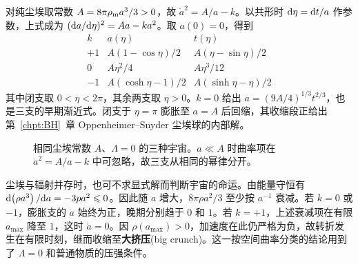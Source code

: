 对纯尘埃取常数 $A=8\pi\rho_{\rm m}a^3/3>0$，故 $\dot a^2=A/a-k$。以共形时 $\dd\eta=\dd t/a$ 作参数，上式成为 $(\dd a/\dd\eta)^2=Aa-ka^2$。取 $a(0)=0$，得到
\begin{equation}\label{eq:cosmo-dust}
    \begin{array}{c|cc}
       k & a(\eta) & t(\eta) \\ \hline
       +1 & A(1-\cos\eta)/2 & A(\eta-\sin\eta)/2 \\
        0 & A\eta^2/4 & A\eta^3/12 \\
       -1 & A(\cosh\eta-1)/2 & A(\sinh\eta-\eta)/2
    \end{array}
\end{equation}
其中闭支取 $0<\eta<2\pi$，其余两支取 $\eta>0$。$k=0$ 给出 $a=(9A/4)^{1/3}t^{2/3}$，也是三支的早期渐近式。闭支于 $\eta=\pi$ 膨胀至 $a=A$ 后回缩，其收缩段正给出第~\ref{chpt:BH}~章 Oppenheimer--Snyder 尘埃球的内部解。

\begin{figure}[htbp]
    \centering
    \caption{相同尘埃常数 $A$、$\Lambda=0$ 的三种宇宙。$a\ll A$ 时曲率项在 $\dot a^2=A/a-k$ 中可忽略，故三支从相同的幂律分开。}
    \label{fig:cosmo-dust}
\end{figure}

尘埃与辐射并存时，也可不求显式解而判断宇宙的命运。由能量守恒有 $\dd(\rho a^3)/\dd a=-3pa^2\leqslant0$。因此随 $a$ 增大，$8\pi\rho a^2/3$ 至少按 $a^{-1}$ 衰减。若 $k=0$ 或 $-1$，膨胀支的 $\dot a$ 始终为正，晚期分别趋于 $0$ 和 $1$。若 $k=+1$，上述衰减项在有限 $a_{\max}$ 降至 $1$，这时 $\dot a=0$。因 $\rho(a_{\max})>0$，加速度在此仍严格为负，故转折发生在有限时刻，继而收缩至\textbf{大挤压}(big crunch)。这一按空间曲率分类的结论用到了 $\Lambda=0$ 和普通物质的压强条件。

